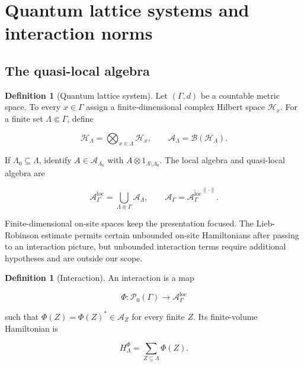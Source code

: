 \documentclass[12pt]{article}
\theoremstyle{definition}
\newtheorem{definition}[theorem]{Definition}
\theoremstyle{remark}
\newcommand{\Alg}{\mathcal A}
\newcommand{\Fin}{\mathcal P_0}
\begin{document}
\section{Quantum lattice systems and interaction norms}

\subsection{The quasi-local algebra}

\begin{definition}[Quantum lattice system]
Let $(\Gamma,d)$ be a countable metric space.  To every $x\in\Gamma$ assign a
finite-dimensional complex Hilbert space $\mathcal H_x$.  For a finite set
$\Lambda\Subset\Gamma$, define

\begin{equation}
  \mathcal H_\Lambda=\bigotimes_{x\in\Lambda}\mathcal H_x,
  \qquad
  \Alg_\Lambda=\mathcal B(\mathcal H_\Lambda).
\end{equation}

If $\Lambda_0\subseteq\Lambda$, identify $A\in\Alg_{\Lambda_0}$ with
$A\otimes 1_{\Lambda\setminus\Lambda_0}$.  The local algebra and quasi-local
algebra are

\begin{equation}
  \Alg^{\mathrm{loc}}_\Gamma
  =\bigcup_{\Lambda\Subset\Gamma}\Alg_\Lambda,
  \qquad
  \Alg_\Gamma
  =\overline{\Alg^{\mathrm{loc}}_\Gamma}^{\|\cdot\|}.
\end{equation}
\end{definition}

Finite-dimensional on-site spaces keep the presentation focused.  The
Lieb-Robinson estimate permits certain unbounded on-site Hamiltonians after
passing to an interaction picture, but unbounded interaction terms require
additional hypotheses and are outside our scope.

\begin{definition}[Interaction]
An interaction is a map

\begin{equation}
  \Phi:\Fin(\Gamma)\longrightarrow\Alg^{\mathrm{loc}}_\Gamma
\end{equation}

such that $\Phi(Z)=\Phi(Z)^*\in\Alg_Z$ for every finite $Z$.  Its
finite-volume Hamiltonian is

\begin{equation}
  H^\Phi_\Lambda=\sum_{Z\subseteq\Lambda}\Phi(Z).
\end{equation}
\end{definition}
\end{document}
